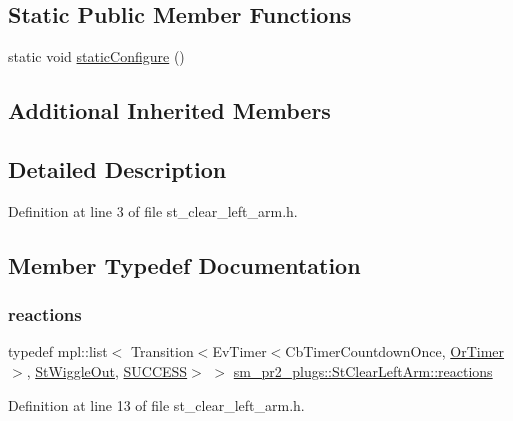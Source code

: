 \subsection*{Static Public Member Functions}
\begin{DoxyCompactItemize}
\item 
static void \hyperlink{structsm__pr2__plugs_1_1StClearLeftArm_a46e6f93715d9c6857c1222616d23c598}{static\+Configure} ()
\end{DoxyCompactItemize}
\subsection*{Additional Inherited Members}


\subsection{Detailed Description}


Definition at line 3 of file st\+\_\+clear\+\_\+left\+\_\+arm.\+h.



\subsection{Member Typedef Documentation}
\mbox{\label{structsm__pr2__plugs_1_1StClearLeftArm_ad3ce24ba9cd08d5c1ec12e041b3af125}} 
\subsubsection{\texorpdfstring{reactions}{reactions}}
{\footnotesize\ttfamily typedef mpl\+::list$<$ Transition$<$Ev\+Timer$<$Cb\+Timer\+Countdown\+Once, \hyperlink{classsm__pr2__plugs_1_1OrTimer}{Or\+Timer}$>$, \hyperlink{structsm__pr2__plugs_1_1StWiggleOut}{St\+Wiggle\+Out}, \hyperlink{classSUCCESS}{S\+U\+C\+C\+E\+SS}$>$ $>$ \hyperlink{structsm__pr2__plugs_1_1StClearLeftArm_ad3ce24ba9cd08d5c1ec12e041b3af125}{sm\+\_\+pr2\+\_\+plugs\+::\+St\+Clear\+Left\+Arm\+::reactions}}



Definition at line 13 of file st\+\_\+clear\+\_\+left\+\_\+arm.\+h.



